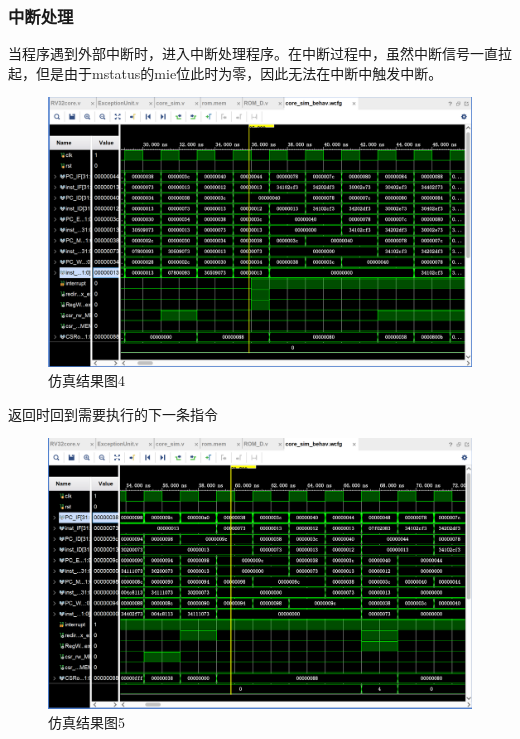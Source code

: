 \subsubsection{中断处理}
当程序遇到外部中断时，进入中断处理程序。在中断过程中，虽然中断信号一直拉起，但是由于mstatus的mie位此时为零，因此无法在中断中触发中断。
\begin{figure}[H] %
	\centering %
	\includegraphics[width=1.0\textwidth]{figs/4.png} %
	\caption{仿真结果图4} %
	\label{Fig.14} %
\end{figure}
返回时回到需要执行的下一条指令
\begin{figure}[H] %
	\centering %
	\includegraphics[width=1.0\textwidth]{figs/5.png} %
	\caption{仿真结果图5} %
	\label{Fig.15} %
\end{figure}

